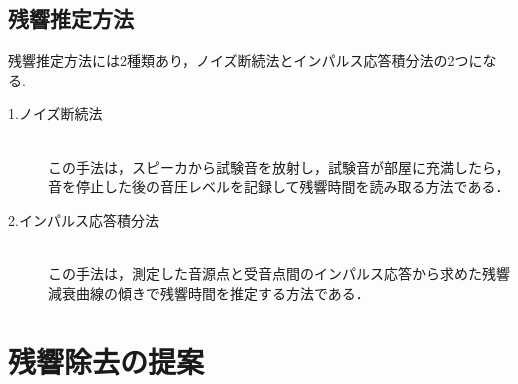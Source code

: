 \documentclass[a4j,11pt]{jsarticle}
\begin{document}
\subsection{残響推定方法}
残響推定方法には2種類あり，ノイズ断続法とインパルス応答積分法の2つになる.
\begin{description}
   \item[1.ノイズ断続法]\mbox{}\\
            この手法は，スピーカから試験音を放射し，試験音が部屋に充満したら，音を停止した後の音圧レベルを記録して残響時間を読み取る方法である．
   \item[2.インパルス応答積分法]\mbox{}\\
	    この手法は，測定した音源点と受音点間のインパルス応答から求めた残響減衰曲線の傾きで残響時間を推定する方法である．
\end{description}

\newpage

\section{残響除去の提案}

\end{document}
